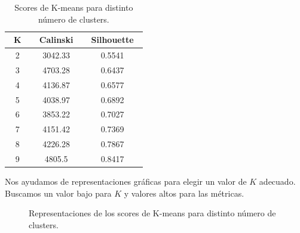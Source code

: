 \documentclass[oneside]{book}
\begin{document}
\begin{table}[H]
  \centering
\begin{tabular}{|c|cc|}
  \hline
  ~\hspace{2mm}K\hspace{2mm}~ & ~\hspace{2mm}Calinski\hspace{2mm}~ & ~\hspace{2mm}Silhouette\hspace{2mm}~ \\ \hline
2 & 3042.33 & 0.5541 \\ \hline
3 & 4703.28 & 0.6437 \\ \hline
4 & 4136.87 & 0.6577 \\ \hline
5 & 4038.97 & 0.6892 \\ \hline
6 & 3853.22 & 0.7027 \\ \hline
7 & 4151.42 & 0.7369 \\ \hline
8 & 4226.28 & 0.7867 \\ \hline
9 & 4805.5 & 0.8417 \\ \hline
\end{tabular}
\caption{Scores de K-means para distinto número de clusters.}
\label{tab:k-means1}
\end{table}

Nos ayudamos de representaciones gráficas para elegir un valor de $K$
adecuado. Buscamos un valor bajo para $K$ y valores altos para las
métricas.

\begin{figure}[H]
  \centering
  \caption{Representaciones de los scores de K-means para distinto número de clusters.}
  \label{fig:k-means1-scores}
\end{figure}
\end{document}
